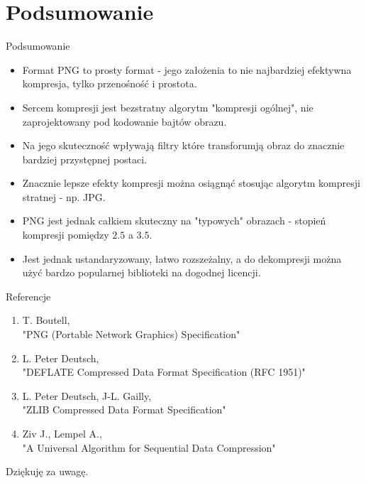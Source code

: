 \documentclass[presentation]{beamer}
\begin{document}
\section{Podsumowanie}
\label{sec:org5bdd377}
\begin{frame}[label={sec:org25e7695}]{Podsumowanie}
\begin{itemize}
\item Format PNG to prosty format - jego założenia to nie najbardziej
efektywna kompresja, tylko przenośność i prostota.
\item Sercem kompresji jest bezstratny algorytm "kompresji ogólnej",
nie zaprojektowany pod kodowanie bajtów obrazu.
\item Na jego skuteczność wpływają filtry które transforumją obraz do
znacznie bardziej przystępnej postaci.
\item Znacznie lepsze efekty kompresji można osiągnąć stosując algorytm
kompresji stratnej - np. JPG.
\item PNG jest jednak całkiem skuteczny na "typowych" obrazach -
stopień kompresji pomiędzy \(2.5\) a \(3.5\).
\item Jest jednak ustandaryzowany, łatwo rozszeżalny, a do dekompresji
można użyć bardzo popularnej biblioteki na dogodnej licencji.
\end{itemize}
\end{frame}

\begin{frame}[label={sec:org750fe07}]{Referencje}
\begin{enumerate}
\item \scriptsize{T. Boutell}, \\
\normalsize{"PNG (Portable Network Graphics) Specification"} \vspace{5pt}
\item \scriptsize{L. Peter Deutsch}, \\
\normalsize{"DEFLATE Compressed Data Format Specification (RFC 1951)"} \vspace{5pt}
\item \scriptsize{L. Peter Deutsch, J-L. Gailly}, \\
\normalsize{"ZLIB Compressed Data Format Specification"} \vspace{5pt}
\item \scriptsize{Ziv J., Lempel A.}, \\
\normalsize{"A Universal Algorithm for Sequential Data Compression"}
\end{enumerate}
\end{frame}

\begin{frame}[label={sec:org5dae114}]{Dziękuję za uwagę.}
\end{frame}
\end{document}
